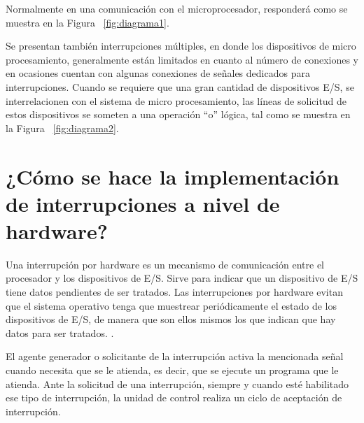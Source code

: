 \documentclass[12pt, letter]{article}
\begin{document}
\setlength{\parindent}{31pt}
Normalmente en una comunicación con el microprocesador, responderá como se muestra  en la Figura ~\ref{fig:diagrama1}.

\setlength{\parindent}{31pt}
Se presentan también interrupciones múltiples, en donde los dispositivos de micro procesamiento, generalmente están limitados en cuanto al número de conexiones y en ocasiones cuentan con algunas conexiones de señales dedicados para interrupciones. Cuando se requiere que una gran cantidad de dispositivos E/S, se interrelacionen con el sistema de micro procesamiento, las líneas de solicitud de estos dispositivos se someten a una operación “o” lógica, tal como se muestra en la Figura ~\ref{fig:diagrama2}.

\section*{¿Cómo se hace la implementación de interrupciones a nivel de hardware?}

\setlength{\parindent}{31pt}
Una interrupción por hardware es un mecanismo de comunicación entre el procesador y los dispositivos de E/S. Sirve para indicar que un dispositivo de E/S tiene datos pendientes de ser tratados. Las interrupciones por hardware evitan que el sistema operativo tenga que muestrear periódicamente el estado de los dispositivos de E/S, de manera que son ellos mismos los que indican que hay datos para ser tratados. \parencite{Int_Ex}.

\setlength{\parindent}{31pt}
 El agente generador o solicitante de la interrupción activa la mencionada señal cuando necesita que se le atienda, es decir, que se ejecute un programa que le atienda. \parencite{Micro} Ante la solicitud de una interrupción, siempre y cuando esté habilitado ese tipo de interrupción, la unidad de control realiza un ciclo de aceptación de interrupción. 
\end{document}
